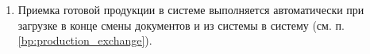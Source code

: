\begin{enumerate}




\item Приемка готовой продукции в системе \erp выполняется автоматически при загрузке в конце смены документов  и  из системы \gofro в систему \erp (см. п. \ref{bp:production_exchange}).

\end{enumerate}

\else   %

